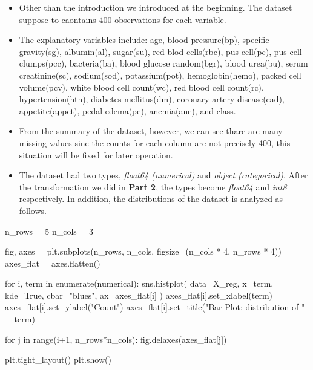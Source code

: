 \documentclass[
  11pt,
  letterpaper,
  DIV=11,
  numbers=noendperiod]{scrartcl}
\newenvironment{Shaded}{\begin{snugshade}}{\end{snugshade}}
\newcommand{\BuiltInTok}[1]{\textcolor[rgb]{0.00,0.23,0.31}{#1}}
\newcommand{\ControlFlowTok}[1]{\textcolor[rgb]{0.00,0.23,0.31}{#1}}
\newcommand{\DecValTok}[1]{\textcolor[rgb]{0.68,0.00,0.00}{#1}}
\newcommand{\KeywordTok}[1]{\textcolor[rgb]{0.00,0.23,0.31}{#1}}
\newcommand{\NormalTok}[1]{\textcolor[rgb]{0.00,0.23,0.31}{#1}}
\newcommand{\OperatorTok}[1]{\textcolor[rgb]{0.37,0.37,0.37}{#1}}
\newcommand{\StringTok}[1]{\textcolor[rgb]{0.13,0.47,0.30}{#1}}
\newcommand{\VariableTok}[1]{\textcolor[rgb]{0.07,0.07,0.07}{#1}}
\providecommand{\tightlist}{%
  \setlength{\itemsep}{0pt}\setlength{\parskip}{0pt}}\usepackage{longtable,booktabs,array}
\begin{document}
\begin{itemize}
\tightlist
\item
  Other than the introduction we introduced at the beginning. The
  dataset suppose to caontains 400 observations for each variable.
\item
  The explanatory variables include: age, blood pressure(bp), specific
  gravity(sg), albumin(al), sugar(su), red blod cells(rbc), pus
  cell(pc), pus cell clumps(pcc), bacteria(ba), blood glucose
  random(bgr), blood urea(bu), serum creatinine(sc), sodium(sod),
  potassium(pot), hemoglobin(hemo), packed cell volume(pcv), white blood
  cell count(wc), red blood cell count(rc), hypertension(htn), diabetes
  mellitus(dm), coronary artery disease(cad), appetite(appet), pedal
  edema(pe), anemia(ane), and class.
\item
  From the summary of the dataset, however, we can see thare are many
  missing values sine the counts for each column are not precisely 400,
  this situation will be fixed for later operation.
\item
  The dataset had two types, \emph{float64 (numerical)} and \emph{object
  (categorical)}. After the transformation we did in \textbf{Part 2},
  the types become \emph{float64} and \emph{int8} respectively. In
  addition, the distributions of the dataset is analyzed as follows.
\end{itemize}

\begin{Shaded}
\begin{Highlighting}[]
\NormalTok{n\_rows }\OperatorTok{=} \DecValTok{5}
\NormalTok{n\_cols }\OperatorTok{=} \DecValTok{3}

\NormalTok{fig, axes }\OperatorTok{=}\NormalTok{ plt.subplots(n\_rows, n\_cols, figsize}\OperatorTok{=}\NormalTok{(n\_cols }\OperatorTok{*} \DecValTok{4}\NormalTok{, n\_rows }\OperatorTok{*} \DecValTok{4}\NormalTok{))}
\NormalTok{axes\_flat }\OperatorTok{=}\NormalTok{ axes.flatten()}

\ControlFlowTok{for}\NormalTok{ i, term }\KeywordTok{in} \BuiltInTok{enumerate}\NormalTok{(numerical):}
\NormalTok{    sns.histplot(}
\NormalTok{        data}\OperatorTok{=}\NormalTok{X\_reg,}
\NormalTok{        x}\OperatorTok{=}\NormalTok{term,}
\NormalTok{        kde}\OperatorTok{=}\VariableTok{True}\NormalTok{,}
\NormalTok{        cbar}\OperatorTok{=}\StringTok{"blues"}\NormalTok{,}
\NormalTok{        ax}\OperatorTok{=}\NormalTok{axes\_flat[i] }
\NormalTok{    )}
\NormalTok{    axes\_flat[i].set\_xlabel(term)}
\NormalTok{    axes\_flat[i].set\_ylabel(}\StringTok{"Count"}\NormalTok{)}
\NormalTok{    axes\_flat[i].set\_title(}\StringTok{"Bar Plot: distribution of "} \OperatorTok{+}\NormalTok{ term)}

\ControlFlowTok{for}\NormalTok{ j }\KeywordTok{in} \BuiltInTok{range}\NormalTok{(i}\OperatorTok{+}\DecValTok{1}\NormalTok{, n\_rows}\OperatorTok{*}\NormalTok{n\_cols):}
\NormalTok{    fig.delaxes(axes\_flat[j])}

\NormalTok{plt.tight\_layout()}
\NormalTok{plt.show()}
\end{Highlighting}
\end{Shaded}
\end{document}
